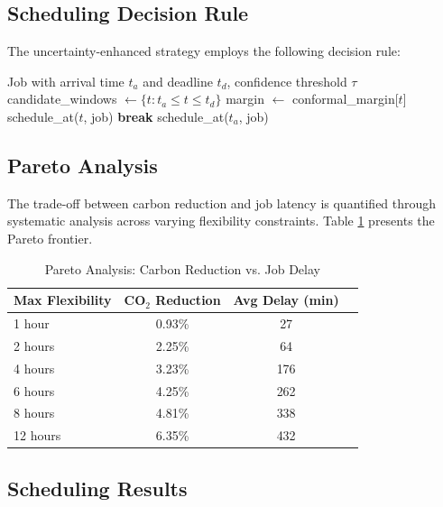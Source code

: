 \documentclass[12pt]{report}
\begin{document}
\subsection{Scheduling Decision Rule}

The uncertainty-enhanced strategy employs the following decision rule:

\begin{algorithm}[H]
\caption{Uncertainty-Enhanced Scheduling}
\begin{algorithmic}[1]
\Require Job with arrival time $t_a$ and deadline $t_d$, confidence threshold $\tau$
\State candidate\_windows $\leftarrow \{t : t_a \leq t \leq t_d\}$
    \State margin $\leftarrow$ conformal\_margin[$t$]
        \State schedule\_at($t$, job)
        \State \textbf{break}
    \EndIf
\EndFor
{}
    \State schedule\_at($t_a$, job) 
\EndIf
\end{algorithmic}
\end{algorithm}

\subsection{Pareto Analysis}

The trade-off between carbon reduction and job latency is quantified through systematic analysis across varying flexibility constraints. Table \ref{tab:pareto} presents the Pareto frontier.

\begin{table}[H]
\centering
\caption{Pareto Analysis: Carbon Reduction vs. Job Delay}
\label{tab:pareto}
\begin{tabular}{lccc}
\toprule
\textbf{Max Flexibility} & \textbf{CO$_2$ Reduction} & \textbf{Avg Delay (min)} \\
\midrule
1 hour & 0.93\% & 27 \\
2 hours & 2.25\% & 64 \\
4 hours & 3.23\% & 176 \\
6 hours & 4.25\% & 262 \\
8 hours & 4.81\% & 338 \\
12 hours & 6.35\% & 432 \\
\bottomrule
\end{tabular}
\end{table}

\subsection{Scheduling Results}
\end{document}
